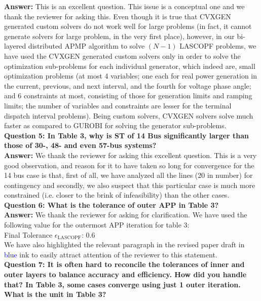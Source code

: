 \documentclass[8pt]{article}
\begin{document}
\textbf{Answer: }This is an excellent question. This issue is a conceptual one and we thank the reviewer for asking this. Even though it is true that CVXGEN generated custom solvers do not work well for large problems (in fact, it cannot generate solvers for large problem, in the very first place), however, in our bi-layered distributed APMP algorithm to solve $(N-1)$ LASCOPF problems, we have used the CVXGEN generated custom solvers only in order to solve the optimization sub-problems for each individual generator, which indeed are, small optimization problems (at most 4 variables; one each for real power generation in the current, previous, and next interval, and the fourth for voltage phase angle; and 6 constraints at most, consisting of those for generation limits and ramping limits; the number of variables and constraints are lesser for the terminal dispatch interval problems). Being custom solvers, CVXGEN solvers solve much faster as compared to GUROBI for solving the generator sub-problems. \\

\textbf{Question 5: In Table 3, why is ST of 14 Bus significantly larger than those of 30-, 48- and even 57-bus systems?}\\

\textbf{Answer: }We thank the reviewer for asking this excellent question. This is a very good observation, and reason for it to have taken so long for convergence for the 14 bus case is that, first of all, we have analyzed all the lines (20 in number) for contingency and secondly, we also suspect that this particular case is much more constrained (i.e. closer to the brink of infeasibility) than the other cases.\\

\textbf{Question 6: What is the tolerance of outer APP in Table 3?}\\

\textbf{Answer: }We thank the reviewer for asking for clarification. We have used the following value for the outermost APP iteration for table 3:\\
Final Tolerance $\epsilon_{\text{LASCOPF}}$: 0.6\\
We have also highlighted the relevant paragraph in the revised paper draft in \textcolor{blue}{blue} ink to easily attract attention of the reviewer to this statement.\\

\textbf{Question 7: It is often hard to reconcile the tolerances of inner and outer layers to balance accuracy and efficiency. How did you handle that? In Table 3, some cases converge using just 1 outer iteration. What is the unit in Table 3?}\\
\end{document}
